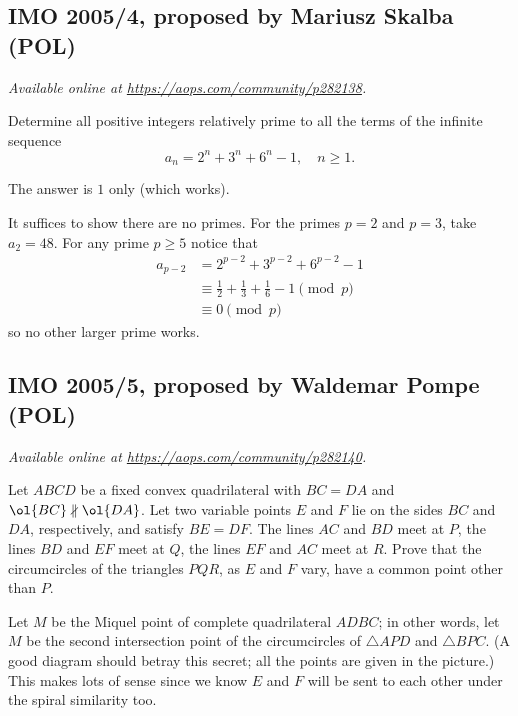 \documentclass[11pt]{scrartcl}
\begin{document}
\subsection{IMO 2005/4, proposed by Mariusz Skalba (POL)}
\textsl{Available online at \url{https://aops.com/community/p282138}.}
\begin{mdframed}[style=mdpurplebox,frametitle={Problem statement}]
Determine all positive integers relatively
prime to all the terms of the infinite sequence
\[ a_n = 2^n+3^n+6^n-1, \quad n \ge 1. \]
\end{mdframed}
The answer is $1$ only (which works).

It suffices to show there are no primes.
For the primes $p=2$ and $p=3$, take $a_2=48$.
For any prime $p \ge 5$ notice that
\begin{align*}
  a_{p-2} &= 2^{p-2} + 3^{p-2} + 6^{p-2} - 1 \\
  &\equiv \frac 12 + \frac 13 + \frac 16 - 1 \pmod p \\
  &\equiv 0 \pmod p
\end{align*}
so no other larger prime works.
\pagebreak

\subsection{IMO 2005/5, proposed by Waldemar Pompe (POL)}
\textsl{Available online at \url{https://aops.com/community/p282140}.}
\begin{mdframed}[style=mdpurplebox,frametitle={Problem statement}]
Let $ABCD$ be a fixed convex quadrilateral
with $BC=DA$ and $\ol{BC} \nparallel \ol{DA}$.
Let two variable points $E$ and $F$ lie on the
sides $BC$ and $DA$, respectively, and satisfy $BE=DF$.
The lines $AC$ and $BD$ meet at $P$,
the lines $BD$ and $EF$ meet at $Q$,
the lines $EF$ and $AC$ meet at $R$.
Prove that the circumcircles of the triangles $PQR$,
as $E$ and $F$ vary, have a common point other than $P$.
\end{mdframed}
Let $M$ be the Miquel point of complete quadrilateral $ADBC$;
in other words, let $M$ be the second intersection point
of the circumcircles of $\triangle APD$ and $\triangle BPC$.
(A good diagram should betray this secret;
all the points are given in the picture.)
This makes lots of sense since we know $E$ and $F$
will be sent to each other under the spiral similarity too.
\end{document}
